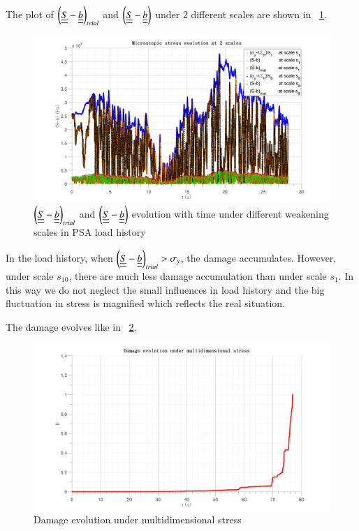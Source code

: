 \documentclass[3p,times,procedia,number]{elsarticle}
\newcommand{\figref}[1]{\figurename~\ref{#1}}
\begin{document}
The plot of $\left( \uline{\uline{S}}-\uline{\uline{b}}\right)_{trial}$ and $\left( \uline{\uline{S}}-\uline{\uline{b}}\right)$ under 2 different scales are shown in \figref{trialreal3d}.
\begin{figure}[!h]
	\centering
	\includegraphics[width=\textwidth]{figures//trialreal3d.png} 
	\caption{$\left( \uline{\uline{S}}-\uline{\uline{b}}\right)_{trial}$ and $\left( \uline{\uline{S}}-\uline{\uline{b}}\right)$ evolution with time under different weakening scales in PSA load history}
	\label{trialreal3d}
\end{figure} 

In the load history, when $\left( \uline{\uline{S}}-\uline{\uline{b}}\right)_{trial}>\sigma_y$, the damage accumulates. However, under scale $s_{10}$, there are much less damage accumulation than under scale $s_1$. In this way we do not neglect the small influences in load history and the big fluctuation in stress is magnified which reflects the real situation.

The damage evolves like in \figref{dam3d}. 


\begin{figure}[!h]
	\centering
	\includegraphics[width=\textwidth]{figures//damage3d.png} 
	\caption{Damage evolution under multidimensional stress}
	\label{dam3d}
\end{figure}
\end{document}

